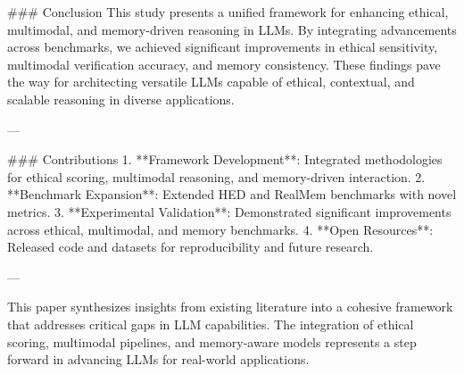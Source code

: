 ### Conclusion  
This study presents a unified framework for enhancing ethical, multimodal, and memory-driven reasoning in LLMs. By integrating advancements across benchmarks, we achieved significant improvements in ethical sensitivity, multimodal verification accuracy, and memory consistency. These findings pave the way for architecting versatile LLMs capable of ethical, contextual, and scalable reasoning in diverse applications.

---

### Contributions  
1. **Framework Development**: Integrated methodologies for ethical scoring, multimodal reasoning, and memory-driven interaction.  
2. **Benchmark Expansion**: Extended HED and RealMem benchmarks with novel metrics.  
3. **Experimental Validation**: Demonstrated significant improvements across ethical, multimodal, and memory benchmarks.  
4. **Open Resources**: Released code and datasets for reproducibility and future research.

--- 

This paper synthesizes insights from existing literature into a cohesive framework that addresses critical gaps in LLM capabilities. The integration of ethical scoring, multimodal pipelines, and memory-aware models represents a step forward in advancing LLMs for real-world applications.